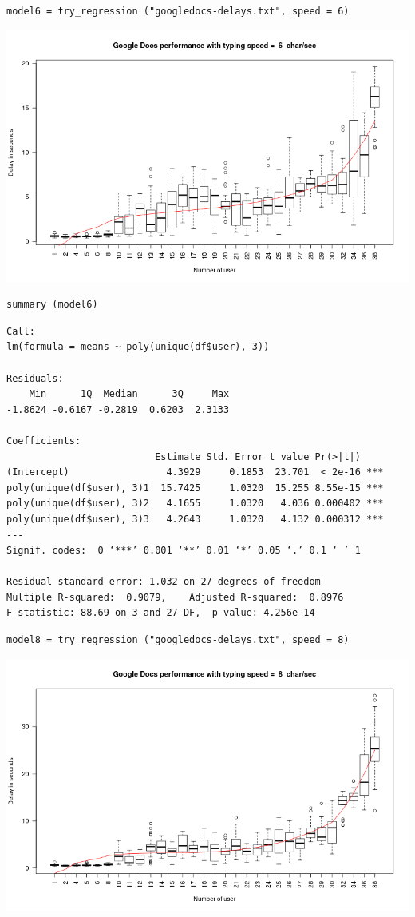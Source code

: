 \documentclass[10pt]{article}
\begin{document}
\begin{verbatim}
model6 = try_regression ("googledocs-delays.txt", speed = 6)
\end{verbatim}

\includegraphics[width=.9\linewidth]{figs/g6.png}

\begin{verbatim}
summary (model6)
\end{verbatim}

\begin{verbatim}
Call:
lm(formula = means ~ poly(unique(df$user), 3))

Residuals:
    Min      1Q  Median      3Q     Max 
-1.8624 -0.6167 -0.2819  0.6203  2.3133 

Coefficients:
                          Estimate Std. Error t value Pr(>|t|)    
(Intercept)                 4.3929     0.1853  23.701  < 2e-16 ***
poly(unique(df$user), 3)1  15.7425     1.0320  15.255 8.55e-15 ***
poly(unique(df$user), 3)2   4.1655     1.0320   4.036 0.000402 ***
poly(unique(df$user), 3)3   4.2643     1.0320   4.132 0.000312 ***
---
Signif. codes:  0 ‘***’ 0.001 ‘**’ 0.01 ‘*’ 0.05 ‘.’ 0.1 ‘ ’ 1

Residual standard error: 1.032 on 27 degrees of freedom
Multiple R-squared:  0.9079,	Adjusted R-squared:  0.8976 
F-statistic: 88.69 on 3 and 27 DF,  p-value: 4.256e-14
\end{verbatim}

\begin{verbatim}
model8 = try_regression ("googledocs-delays.txt", speed = 8)
\end{verbatim}

\includegraphics[width=.9\linewidth]{figs/g8.png}
\end{document}
